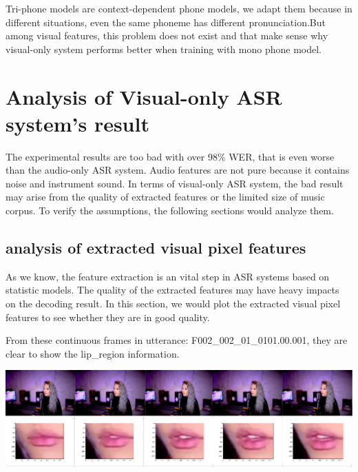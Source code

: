 Tri-phone models are context-dependent phone models, we adapt them because in different situations, even the same phoneme has different pronunciation.But among visual features, this problem does not exist and that make sense why visual-only system performs better when training with mono phone model.

\section{Analysis of Visual-only ASR system's result}
The experimental results are too bad with over 98\% WER, that is even worse than the audio-only ASR system. Audio features are not pure because it contains noise and instrument sound. In terms of visual-only ASR system, the bad result may arise from the quality of extracted features or the limited size of music corpus. To verify the assumptions, the following sections would analyze them.

\subsection{analysis of extracted visual pixel features}
As we know, the feature extraction is an vital step in ASR systems based on statistic models. The quality of the extracted features may have heavy impacts on the decoding result. In this section, we would plot the extracted visual pixel features to see whether they are in good quality.

From these continuous frames in utterance: F002\_002\_01\_0101.00.001, they are clear to show the lip\_region information.
\begin{center}
\includegraphics[width=0.8\linewidth]{images/F002.jpg}\\[1cm]
\label{img:F002}
\end{center}

